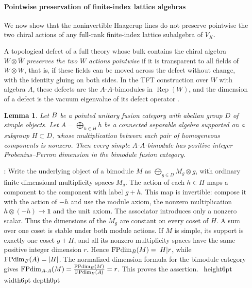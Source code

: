 \documentclass[leqno]{article}
\let\cal\relax
\newcommand{\cal}{\mathcal}
\newcommand{\qed}{\hfill \vrule height6pt  width6pt depth0pt}
\newcommand{\ot}{\otimes}
\DeclareMathOperator{\Rep}{Rep}
\newtheorem{lemma}[thm]{Lemma}
\newenvironment{proof}[1][]{\noindent {\it Proof #1} : }{\hbox{~}\qed
\smallskip
}
\numberwithin{equation}{section}
\begin{document}
\paragraph{Pointwise preservation of finite-index lattice algebras}
We now show that the noninvertible Haagerup lines do not preserve pointwise the two chiral actions of any full-rank finite-index lattice subalgebra of $V_K$.

A topological defect of a full theory whose bulk contains the chiral algebra $W\ot\overline W$ \emph{preserves the two $W$ actions pointwise} if it is transparent to all fields of $W\ot\overline W$, that is, if these fields can be moved across the defect without change, with the identity gluing on both sides. In the TFT construction over $W$ with algebra $A$, these defects are the $A$-$A$-bimodules in $\Rep(W)$, and the dimension of a defect is the vacuum eigenvalue of its defect operator \cite{FFRS07}.

\begin{lemma}
\label{lem:pointed-extension-integral-defects}
Let $\cal B$ be a pointed unitary fusion category with abelian group $D$ of simple objects. Let $A = \bigoplus_{h \in H} h$ be a connected separable algebra supported on a subgroup $H \subset D$, whose multiplication between each pair of homogeneous components is nonzero. Then every simple $A$-$A$-bimodule has positive integer Frobenius--Perron dimension in the bimodule fusion category.
\end{lemma}

\begin{proof}
Write the underlying object of a bimodule $M$ as $\bigoplus_{g \in D} M_g \ot g$, with ordinary finite-dimensional multiplicity spaces $M_g$. The action of each $h \in H$ maps a component to the component with label $g+h$. This map is invertible: compose it with the action of $-h$ and use the module axiom, the nonzero multiplication $h \ot (-h) \to \mathbf1$ and the unit axiom. The associator introduces only a nonzero scalar. Thus the dimensions of the $M_g$ are constant on every coset of $H$. A sum over one coset is stable under both module actions. If $M$ is simple, its support is exactly one coset $g+H$, and all its nonzero multiplicity spaces have the same positive integer dimension $r$. Hence $\operatorname{FPdim}_{\cal B}(M) = |H|r$, while $\operatorname{FPdim}_{\cal B}(A) = |H|$. The normalized dimension formula for the bimodule category \cite{FFRS07} gives $\operatorname{FPdim}_{A\text{-}A}(M) = \frac{\operatorname{FPdim}_{\cal B}(M)}{\operatorname{FPdim}_{\cal B}(A)} = r$. This proves the assertion.
\end{proof}
\end{document}
